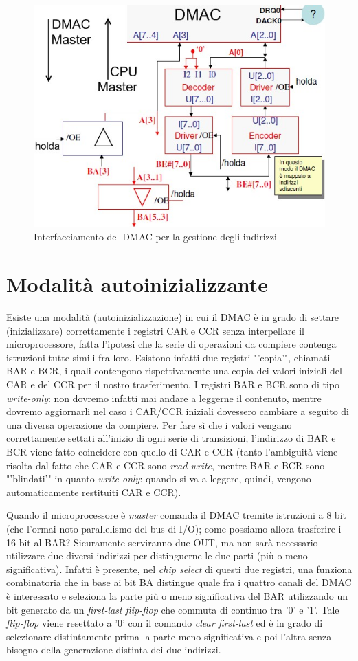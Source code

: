 \begin{figure}[!h]
\centering
\includegraphics[width=0.75\columnwidth]{img/dmacIndirizzi}
\caption{Interfacciamento del DMAC per la gestione degli indirizzi}
\label{fig:dmacIndirizzi}
\end{figure}

\section{Modalità autoinizializzante}
\label{sec:autoinit}

Esiste una modalità (autoinizializzazione) in cui il DMAC è in grado di settare (inizializzare) correttamente i registri CAR e CCR senza interpellare il microprocessore, fatta l'ipotesi che la serie di operazioni da compiere contenga istruzioni tutte simili fra loro. Esistono infatti due registri "'copia'", chiamati BAR e BCR, i quali contengono rispettivamente una copia dei valori iniziali del CAR e del CCR per il nostro trasferimento. I registri BAR e BCR sono di tipo \textit{write-only}: non dovremo infatti mai andare a leggerne il contenuto, mentre dovremo aggiornarli nel caso i CAR/CCR iniziali dovessero cambiare a seguito di una diversa operazione da compiere. Per fare sì che i valori vengano correttamente settati all'inizio di ogni serie di transizioni, l'indirizzo di BAR e BCR viene fatto coincidere con quello di CAR e CCR (tanto l'ambiguità viene risolta dal fatto che CAR e CCR sono \textit{read-write}, mentre BAR e BCR sono "'blindati'" in quanto \textit{write-only}: quando si va a leggere, quindi, vengono automaticamente restituiti CAR e CCR).

Quando il microprocessore è \textit{master} comanda il DMAC tremite istruzioni a 8 bit (che l'ormai noto parallelismo del bus di I/O); come possiamo allora trasferire i 16 bit al BAR? Sicuramente serviranno due OUT, ma non sarà necessario utilizzare due diversi indirizzi per distinguerne le due parti (più o meno significativa). Infatti è presente, nel \textit{chip select} di questi due registri, una funziona combinatoria che in base ai bit BA distingue quale fra i quattro canali del DMAC è interessato e seleziona la parte più o meno significativa del BAR utilizzando un bit generato da un \textit{first-last flip-flop} che commuta di continuo tra '0' e '1'. Tale \textit{flip-flop} viene resettato a '0' con il comando \textit{clear first-last} ed è in grado di selezionare distintamente prima la parte meno significativa e poi l'altra senza bisogno della generazione distinta dei due indirizzi.

